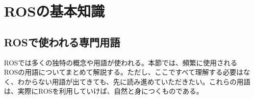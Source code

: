 
\chapter{ROSの基本知識}

\section{ROSで使われる専門用語}
\label{section:terms}

ROSでは多くの独特の概念や用語が使われる。本節では、頻繁に使用されるROSの用語についてまとめて解説する。ただし、ここですべて理解する必要はなく、わからない用語が出てきても、先に読み進めていただきたい。これらの用語は、実際にROSを利用していけば、自然と身につくものである。


